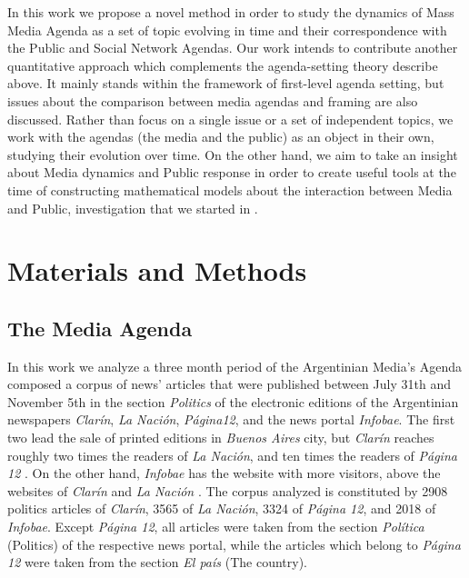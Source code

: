 \documentclass[a4paper, 12pt]{article}
\begin{document}
\par In this work we propose a novel method in order to study the dynamics of Mass Media Agenda as a set of topic evolving in time and their correspondence with the Public and Social Network Agendas.  Our work intends to contribute another quantitative approach which complements the agenda-setting theory describe above. It mainly stands within the framework of first-level agenda setting, but issues about the comparison between media agendas and framing are also discussed.
Rather than focus on a single issue or a set of independent topics, we work with the agendas (the media and the public) as an object in their own, studying their evolution over time. 
On the other hand, we aim to take an insight about Media dynamics and Public response in order to create useful tools at the time of constructing mathematical models about the interaction between Media and Public, investigation that we started in \cite{pinto2016setting}.


%
\section{Materials and Methods} \label{sec:MatMeth}

\subsection{The Media Agenda}

In this work we analyze a three month period of the Argentinian Media's Agenda composed a corpus of news' articles that were published between July 31th and November 5th in the section \emph{Politics} of the electronic editions of the Argentinian newspapers \emph{Clar\'in}, \emph{La Naci\'on}, \emph{P\'agina12}, and the news portal \emph{Infobae}. The first two lead the sale of printed editions in \emph{Buenos Aires} city, but \emph{Clar\'in} reaches roughly two times the readers of \emph{La Naci\'on}, and ten times the readers of \emph{P\'agina 12} \cite{IVC}. On the other hand, \emph{Infobae} has the website with more visitors, above the websites of \emph{Clar\'in} and \emph{La Naci\'on} \cite{AlexaAR}.
The corpus analyzed is constituted by 2908 politics articles of \emph{Clar\'in}, 3565 of \emph{La Naci\'on}, 3324 of \emph{P\'agina 12}, and 2018 of \emph{Infobae}. Except \emph{P\'agina 12}, all articles were taken from the section \emph{Pol\'itica}  (Politics) of the respective news portal, while the articles which belong to \emph{P\'agina 12} were taken from the section \emph{El pa\'is} (The country).
\end{document}
